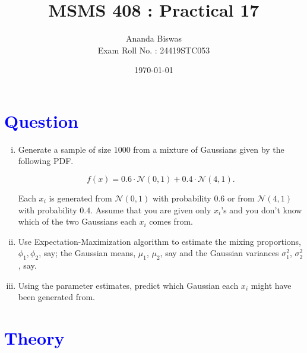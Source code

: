 \documentclass[11pt, a4paper]{article}\usepackage[]{graphicx}\usepackage[]{xcolor}
\title{MSMS 408 : Practical 17}
\author{{\fontsize{25}{20} \benyorithafont Ananda Biswas} \\[1em] Exam Roll No. : 24419STC053}
\date{\today}
\begin{document}
\maketitle


\section*{\faArrowAltCircleRight[regular] \textcolor{blue}{Question}}

\begin{enumerate}[(i)]
\item Generate a sample of size $1000$ from a mixture of Gaussians given by the following PDF.

$$f(x) = 0.6 \cdot \mathcal{N}(0, 1) + 0.4 \cdot \mathcal{N}(4, 1).$$

Each $x_i$ is generated from $\mathcal{N}(0, 1)$ with probability $0.6$ or from $\mathcal{N}(4, 1)$ with probability $0.4$. Assume that you are given only $x_i$'s and you don't know which of the two Gaussians each $x_i$ comes from.

\item Use Expectation-Maximization algorithm to estimate the mixing proportions, $\phi_1, \phi_2$, say; the Gaussian means, $\mu_1$, $\mu_2$, say and the Gaussian variances $\sigma_1^2$, $\sigma_2^2$, say.

\item Using the parameter estimates, predict which Gaussian each $x_i$ might have been generated from.
\end{enumerate}


\section*{\faArrowAltCircleRight[regular] \textcolor{blue}{Theory}}

\vspace{1cm}
\end{document}
